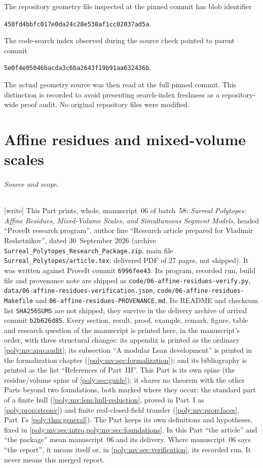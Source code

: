 \documentclass[11pt,a4paper]{article}
\numberwithin{equation}{section}
\theoremstyle{plain}
\newcommand{\wtag}{\textup{[write]}}%
\newcommand{\pathcode}[1]{\nolinkurl{#1}}
\begin{document}
The repository geometry file inspected at the pinned commit has blob
identifier
\begin{center}\small\texttt{450fd4bbfc017e0da24c28e538af1cc02037ad5a}.\end{center}
The code-search index observed during the source check pointed to parent
commit
\begin{center}\small\texttt{5e0f4e05046bacda3c6ba2643f19b91aa632436b}.\end{center}
The actual geometry source was then read at the full pinned commit. This distinction is
recorded to avoid presenting search-index freshness as a repository-wide
proof audit. No original repository files were modified.


\part{Affine residues and mixed-volume scales}\label{poly:part:mv}

\paragraph{Source and scope.}\wtag{} This Part prints, whole, manuscript~06 of
batch~58: \emph{Surreal Polytopes: Affine Residues, Mixed-Volume Scales, and
Simultaneous Segment Models}, headed ``ProveIt research program'', author line
``Research article prepared for Vladimir Reshetnikov'', dated 30~September 2026
(archive \pathcode{Surreal_Polytopes_Research_Package.zip}, main file
\pathcode{Surreal_Polytopes/article.tex}; delivered PDF of 27 pages, not
shipped). It was written against ProveIt commit \pathcode{6996fee43}. Its
program, recorded run, build file and provenance note are shipped as
\pathcode{code/06-affine-residues-verify.py},
\pathcode{data/06-affine-residues-verification.json},
\pathcode{code/06-affine-residues-Makefile} and
\pathcode{06-affine-residues-PROVENANCE.md}. Its README and checksum list
\texttt{SHA256SUMS} are not shipped; they survive in the delivery archive of
arrival commit \pathcode{b2b626d85}. Every
section, result, proof, example, remark, figure, table and research question of
the manuscript is printed here, in the manuscript's order, with three
structural changes: its appendix is printed as the ordinary
\cref{poly:mv:app:audit}; its subsection ``A modular Lean development'' is
printed in the formalization chapter (\cref{poly:mv:sec:formalization}); and
its bibliography is printed as the list ``References of Part~III''. This Part
is its own spine (the residue/volume spine of \cref{poly:sec:guide}); it shares
no theorem with the other Parts beyond two foundations, both marked where they
occur: the standard part of a finite hull (\cref{poly:mv:lem:hull-reduction},
proved in Part~I as \cref{poly:prop:stconv}) and finite real-closed-field
transfer (\cref{poly:mv:prop:faces}, Part~I's \cref{poly:thm:general}). The
Part keeps its own definitions and hypotheses, fixed in
\cref{poly:mv:sec:intro,poly:mv:sec:foundations}. In this Part ``the article''
and ``the package'' mean manuscript~06 and its delivery. Where manuscript~06
says ``the report'', it means itself or, in \cref{poly:mv:sec:verification},
its recorded run. It never means this merged report.
\end{document}
